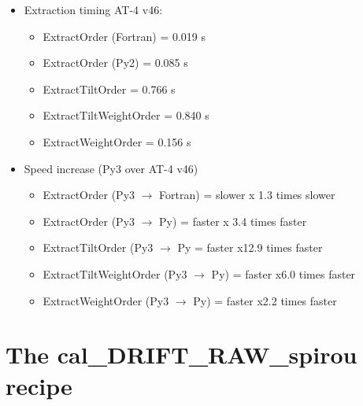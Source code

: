 \begin{itemize}
\begin{itemize}
	\item Extraction timing AT-4 v46:
		\begin{itemize}
		\item ExtractOrder (Fortran) = 0.019 s
		\item ExtractOrder (Py2) = 0.085 s
		\item ExtractTiltOrder = 0.766 s
		\item ExtractTiltWeightOrder = 0.840 s
		\item ExtractWeightOrder = 0.156 s
         \end{itemize}

	\item Speed increase (Py3 over AT-4 v46)
		\begin{itemize}
		\item ExtractOrder (Py3 $\rightarrow$ Fortran) = slower    x 1.3 times slower
		\item ExtractOrder (Py3 $\rightarrow$ Py) = faster     x 3.4 times faster
		\item ExtractTiltOrder (Py3 $\rightarrow$ Py = faster     x12.9 times faster
		\item ExtractTiltWeightOrder (Py3 $\rightarrow$ Py) = faster    x6.0 times faster
		\item ExtractWeightOrder (Py3 $\rightarrow$ Py) = faster    x2.2 times faster
		\end{itemize}

	\end{itemize}

\end{itemize}


\section{The cal\_DRIFT\_RAW\_spirou recipe}
\label{ch:changelog:At4:cal_DRIFT_RAW_spirou}

